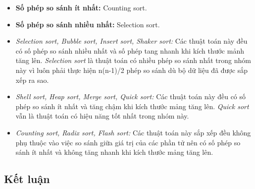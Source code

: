     \begin{itemize}
        \item \textbf{Số phép so sánh ít nhất:} Counting sort.
        \item \textbf{Số phép so sánh nhiều nhất:} Selection sort.
        \item \textit{Selection sort, Bubble sort, Insert sort, Shaker sort:} Các thuật toán này đều có số phép so sánh nhiều nhất và số phép tang nhanh khi kích thước mảnh tăng lên. \textit{Selection sort} là thuật toán có nhiều phép so sánh nhất trong nhóm này vì luôn phải thực hiện n(n-1)/2 phép so sánh dù bộ dữ liệu đã được sắp xếp ra sao.
        \item \textit{Shell sort, Heap sort, Merge sort, Quick sort:} Các thuật toán này đều có số phép so sánh ít nhất và tăng chậm khi kích thước mảng tăng lên. \textit{Quick sort} vẫn là thuật toán có hiệu năng tốt nhất trong nhóm này.
        \item \textit{Counting sort, Radix sort, Flash sort:} Các thuật toán này sắp xếp đều không phụ thuộc vào việc so sánh giữa giá trị của các phần tử nên có số phép so sánh ít nhất và không tăng nhanh khi kích thước mảng tăng lên.
    \end{itemize}



\newpage
\subsection{Kết luận}

\newpage
